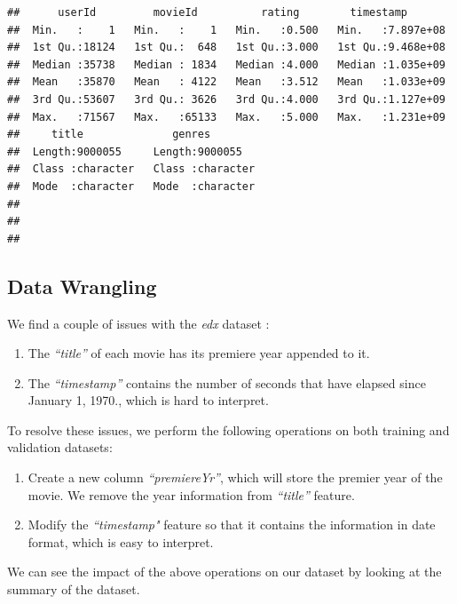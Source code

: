 \documentclass[]{article}
\begin{document}
\begin{verbatim}
##      userId         movieId          rating        timestamp        
##  Min.   :    1   Min.   :    1   Min.   :0.500   Min.   :7.897e+08  
##  1st Qu.:18124   1st Qu.:  648   1st Qu.:3.000   1st Qu.:9.468e+08  
##  Median :35738   Median : 1834   Median :4.000   Median :1.035e+09  
##  Mean   :35870   Mean   : 4122   Mean   :3.512   Mean   :1.033e+09  
##  3rd Qu.:53607   3rd Qu.: 3626   3rd Qu.:4.000   3rd Qu.:1.127e+09  
##  Max.   :71567   Max.   :65133   Max.   :5.000   Max.   :1.231e+09  
##     title              genres         
##  Length:9000055     Length:9000055    
##  Class :character   Class :character  
##  Mode  :character   Mode  :character  
##                                       
##                                       
## 
\end{verbatim}

\subsection{Data Wrangling}
\label{sec:dw}

We find a couple of issues with the \emph{edx} dataset :

\begin{enumerate}
\item The \emph{``title''} of each movie has its premiere year appended to it.
\item The \emph{``timestamp''} contains the number of seconds that have elapsed since January 1, 1970., which is hard to interpret.
\end{enumerate}

To resolve these issues, we perform the following operations on both
training and validation datasets:

\begin{enumerate}
\item Create a new column \emph{``premiereYr''}, which will store the premier year of the movie. We remove the year information from \emph{``title''} feature.
\item Modify the \emph{``timestamp"} feature so that it contains the information in date format, which is easy to interpret. 
\end{enumerate}

We can see the impact of the above operations on our dataset by looking
at the summary of the dataset.
\end{document}
